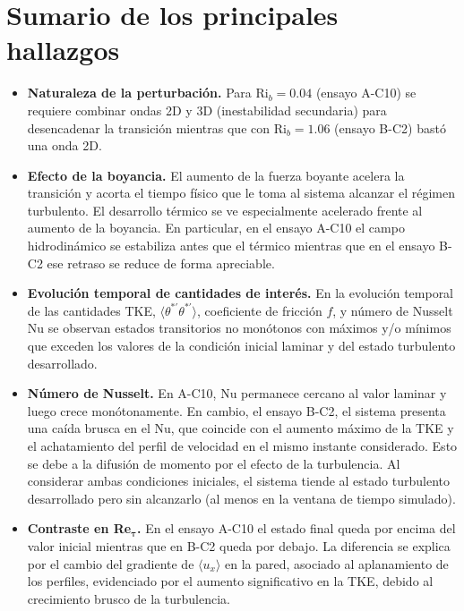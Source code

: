 \section{Sumario de los principales hallazgos}

\begin{itemize}
  \item \textbf{Naturaleza de la perturbación.} Para $\mathrm{Ri}_b=0\text{.}04$ (ensayo A-C10) se requiere combinar ondas 2D y 3D (inestabilidad secundaria) para desencadenar la transición mientras que con $\mathrm{Ri}_b=1\text{.}06$ (ensayo B-C2) bastó una onda 2D.
  
  \item \textbf{Efecto de la boyancia.} El aumento de la fuerza boyante acelera la transición y acorta el tiempo físico que le toma al sistema alcanzar el régimen turbulento. El desarrollo térmico se ve especialmente acelerado frente al aumento de la boyancia. En particular, en el ensayo A-C10 el campo hidrodinámico se estabiliza antes que el térmico mientras que en el ensayo B-C2 ese retraso se reduce de forma apreciable.
  
  \item \textbf{Evolución temporal de cantidades de interés.} En la evolución temporal de las cantidades TKE, $\langle \theta^{* \prime} \theta^{* \prime} \rangle$, coeficiente de fricción $f$, y número de Nusselt Nu se observan estados transitorios no monótonos con máximos y/o mínimos que exceden los valores de la condición inicial laminar y del estado turbulento desarrollado.
  
  \item \textbf{Número de Nusselt.} En A-C10, Nu permanece cercano al valor laminar y luego crece monótonamente. En cambio, el ensayo B-C2, el sistema presenta una caída brusca en el Nu, que coincide con el aumento máximo de la TKE y el achatamiento del perfil de velocidad en el mismo instante considerado. Esto se debe a la difusión de momento por el efecto de la turbulencia. Al considerar ambas condiciones iniciales, el sistema tiende al estado turbulento desarrollado pero sin alcanzarlo (al menos en la ventana de tiempo simulado).
    
  \item \textbf{Contraste en Re$\mathbf{_{\tau}}$.} En el ensayo A-C10 el estado final queda por encima del valor inicial mientras que en B-C2 queda por debajo. La diferencia se explica por el cambio del gradiente de $\langle u_x \rangle$ en la pared, asociado al aplanamiento de los perfiles, evidenciado por el aumento significativo en la TKE, debido al crecimiento brusco de la turbulencia.

\end{itemize}

